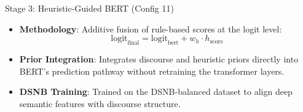 \documentclass[aspectratio=169]{beamer}
\begin{document}
\begin{frame}{Stage 3: Heuristic-Guided BERT (Config 11)}
    \begin{itemize}
        \item \textbf{Methodology}: Additive fusion of rule-based scores at the logit level:
            $$\text{logit}_{\text{final}} = \text{logit}_{\text{bert}} + w_h \cdot h_{\text{score}}$$
        \vspace{0.2cm}
        \item \textbf{Prior Integration}: Integrates discourse and heuristic priors directly into BERT's prediction pathway without retraining the transformer layers.
        \vspace{0.2cm}
        \item \textbf{DSNB Training}: Trained on the DSNB-balanced dataset to align deep semantic features with discourse structure.
    \end{itemize}
\end{frame}
\end{document}
